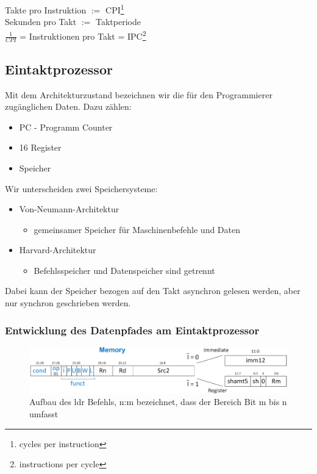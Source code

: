 \documentclass[a4paper,12pt,leqno]{article}
\begin{document}
Takte pro Instruktion $:=$ CPI\footnote{cycles per instruction}\\
Sekunden pro Takt $:=$ Taktperiode\\
$\frac{1}{CPI}$ = Instruktionen pro Takt = IPC\footnote{instructions per cycle}

\subsection{Eintaktprozessor}
\label{Architekturzustand}
Mit dem Architekturzustand bezeichnen wir die für den Programmierer zugänglichen Daten.
Dazu zählen:
\begin{itemize}
\item PC - Programm Counter
\item 16 Register
\item Speicher
\end{itemize}

Wir unterscheiden zwei Speichersysteme:
\begin{itemize}
\item Von-Neumann-Architektur
	\begin{itemize}
	\item gemeinsamer Speicher für Maschinenbefehle und Daten
	\end{itemize}
\item Harvard-Architektur
	\begin{itemize}
	\item Befehlsspeicher und Datenspeicher sind getrennt
	\end{itemize}
\end{itemize}

Dabei kann der Speicher bezogen auf den Takt asynchron gelesen werden, aber nur synchron geschrieben werden.\\

\subsubsection{Entwicklung des Datenpfades am Eintaktprozessor}

\begin{figure}[h!]
\centering
\includegraphics[scale=0.5]{Grafiken/ldr-Befehl.png}
\caption{Aufbau des ldr Befehls, n:m bezeichnet, dass der Bereich Bit m bis n umfasst}
\label{ldrBefehl}
\end{figure}
\end{document}

